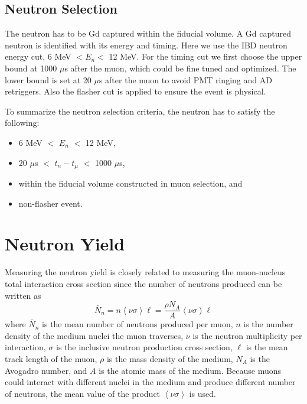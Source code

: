 \subsection{Neutron Selection}\label{sec:n_select}

The neutron has to be Gd captured within the fiducial volume. A Gd captured neutron is identified with its energy and timing. Here we use the IBD neutron energy cut, 6 MeV $< E_n <$ 12 MeV. For the timing cut we first choose the upper bound at 1000 $\mu$s after the muon, which could be fine tuned and optimized. The lower bound is set at 20 $\mu$s after the muon to avoid PMT ringing and AD retriggers. Also the flasher cut is applied to ensure the event is physical.

\vspace{\baselineskip}
To summarize the neutron selection criteria, the neutron has to satisfy the following:
\begin{itemize}
  \item 6 MeV $<$ $E_n$ $<$ 12 MeV,
  \item 20 $\mu$s $<$ $t_n-t_\mu$ $<$ 1000 $\mu$s,
  \item within the fiducial volume constructed in muon selection, and
  \item non-flasher event.
\end{itemize}


\section{Neutron Yield}
Measuring the neutron yield is closely related to measuring the muon-nucleus total interaction cross section since the number of neutrons produced can be written as
\begin{equation} \label{eq:neutron_number}
	\bar{N}_n=n\left\langle\nu\sigma\right\rangle\ell=\frac{\rho N_A}{A}\left\langle\nu\sigma\right\rangle\ell
\end{equation}
where $\bar{N}_n$ is the mean number of neutrons produced per muon, $n$ is the number density of the medium nuclei the muon traverses, $\nu$ is the neutron multiplicity per interaction, $\sigma$ is the inclusive neutron production cross section, $\ell$ is the mean track length of the muon, $\rho$ is the mass density of the medium, $N_A$ is the Avogadro number, and $A$ is the atomic mass of the medium. Because muons could interact with different nuclei in the medium and produce different number of neutrons, the mean value of the product $\left\langle\nu\sigma\right\rangle$ is used.

